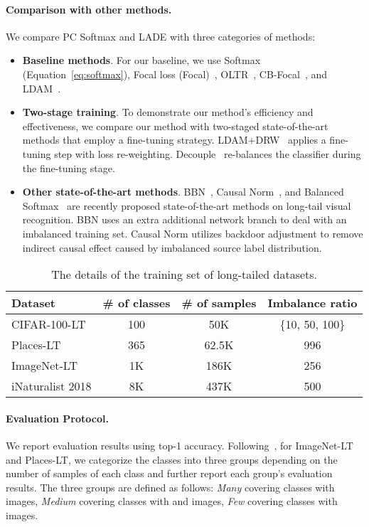 \documentclass[final]{cvpr}
\begin{document}
\paragraph{Comparison with other methods.} 
We compare PC Softmax and LADE with three categories of methods:
\begin{itemize}[leftmargin=*]
\item \textbf{Baseline methods}. For our baseline, we use Softmax (Equation~\ref{eq:softmax}), Focal loss (Focal)~\cite{lin2017focal}, OLTR~\cite{liu2019large}, CB-Focal~\cite{cui2019class}, and LDAM~\cite{cao2019learning}.

\item \textbf{Two-stage training}.
To demonstrate our method's efficiency and effectiveness, we compare our method with two-staged state-of-the-art methods that employ a fine-tuning strategy.
LDAM+DRW~\cite{cao2019learning} applies a fine-tuning step with loss re-weighting.
Decouple~\cite{kang2019decoupling} re-balances the classifier during the fine-tuning stage.

\item \textbf{Other state-of-the-art methods}. 
BBN~\cite{zhou2020bbn}, Causal Norm~\cite{tang2020long}, and Balanced Softmax~\cite{ren2020balanced} are recently proposed state-of-the-art methods on long-tail visual recognition.
BBN uses an extra additional network branch to deal with an imbalanced training set.
Causal Norm utilizes backdoor adjustment to remove indirect causal effect caused by imbalanced source label distribution.
\end{itemize}

\begin{table}[t]
\footnotesize
\centering
\caption{The details of the training set of long-tailed datasets.}
\vspace{0pt}
{
\begin{tabular}{l c c c}
\toprule
Dataset & \# of classes & \# of samples & Imbalance ratio \\
\midrule
CIFAR-100-LT & 100 & 50K & \{10, 50, 100\} \\
Places-LT & 365 & 62.5K & 996 \\
ImageNet-LT & 1K & 186K & 256 \\
iNaturalist 2018 & 8K & 437K & 500 \\
\bottomrule
\end{tabular}
}
\label{tab:dataset}
\vspace{0mm}
\end{table} \paragraph{Evaluation Protocol.}
We report evaluation results using top-1 accuracy.
Following~\cite{liu2019large}, for ImageNet-LT and Places-LT, we categorize the classes into three groups depending on the number of samples of each class and further report each group's evaluation results.
The three groups are defined as follows:
\textit{Many} covering classes with  images, \textit{Medium} covering classes with  and  images, \textit{Few} covering classes with  images.
\end{document}
